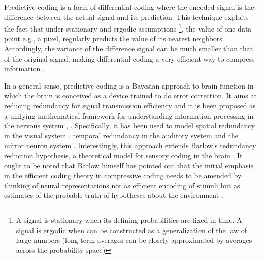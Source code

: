 \documentclass[11pt, onecolumn]{article}
\begin{document}
Predictive coding is a form of differential coding where the encoded signal is the difference between the actual signal and its prediction. This technique exploits the fact that under stationary and ergodic assumptions \footnote{A signal is stationary when its defining probabilities are fixed in time. A signal is ergodic when can be constructed as a generalization of the law of large numbers (long term averages can be closely approximated by averages across the probability space)}, the value of one data point e.g., a pixel, regularly predicts the value of its nearest neighbors. Accordingly, the variance of the difference signal can be much smaller than that of the original signal, making differential coding a very efficient way to compress information \citep{shi_image_1999}.

In a general sense, predictive coding is a Bayesian approach to brain function in which the brain is conceived as a device trained to do error correction. It aims at reducing redundancy for signal transmission efficiency and it is been proposed as a unifying mathematical framework for understanding information processing in the nervous system \citep{Friston:2010}, \citep{huang_predictive_2011}. Specifically, it has been used to model spatial redundancy in the visual system \citep{srinivasan_predictive_1982}, temporal redundancy in the auditory system \citep{baldeweg_repetition_2006} and the mirror neuron system \citep{kilner_predictive_2007}. Interestingly, this approach extends Barlow's redundancy reduction hypothesis, a theoretical model for sensory coding in the brain \citep{Barlow:1972}. It ought to be noted that Barlow himself has pointed out that the initial emphasis in the efficient coding theory in compressive coding %
needs to be amended by thinking of neural representations not as efficient encoding of stimuli but as estimates of the probable truth of hypotheses about the environment \citep{barlow_redundancy_2001}. 
\end{document}
